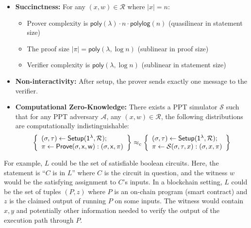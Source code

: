 \begin{definition}
\begin{itemize}
    \item \textbf{Succinctness:} For any $(x, w) \in \mathcal{R}$ where $|x| = n$:
    \begin{itemize}
     \item Prover complexity is $\mathsf{poly}(\lambda) \cdot n \cdot \mathsf{polylog}(n)$ (quasilinear in statement size)
        \item The proof size $|\pi| = \mathsf{poly}(\lambda, \log n)$ (sublinear in proof size) 
        \item Verifier complexity is $\mathsf{poly}(\lambda, \log n)$ (sublinear in statement size)
    \end{itemize}
    
    \item \textbf{Non-interactivity:} After setup, the prover sends exactly one message to the verifier.
    \item \textbf{Computational Zero-Knowledge:} There exists a PPT simulator $\mathcal{S}$ such that for any PPT adversary $\mathcal{A}$, any $(x, w) \in \mathcal{R}$, the following distributions are computationally indistinguishable:
    \begin{align*}
    \left\{ \begin{array}{l}
    (\sigma, \tau) \leftarrow \sf{Setup}(1^{\lambda}, \mathcal{R}); \\
    \pi \leftarrow \sf{Prove}(\sigma, x, w) : (\sigma, x, \pi)
    \end{array} \right\} \approx_c
    \left\{ \begin{array}{l}
    (\sigma, \tau) \leftarrow \sf{Setup}(1^{\lambda}, \mathcal{R}); \\
    \pi \leftarrow \mathcal{S}(\sigma, \tau, x) : (\sigma, x, \pi)
    \end{array} \right\}
\end{align*}
\end{itemize}
\end{definition}

\noindent For example, $L$ could be the set of satisfiable boolean circuits. Here, the statement is ``$C$ is in $L$'' where $C$ is the circuit in question, and the witness $w$ would be the satisfying assignment to $C$'s inputs. In a blockchain setting, $L$ could be the set of tuples $(P, z)$ where $P$ is an on-chain program (smart contract) and $z$ is the claimed output of running $P$ on some inputs. The witness would contain $x, y$ and potentially other information needed to verify the output of the execution path through $P$.\\

